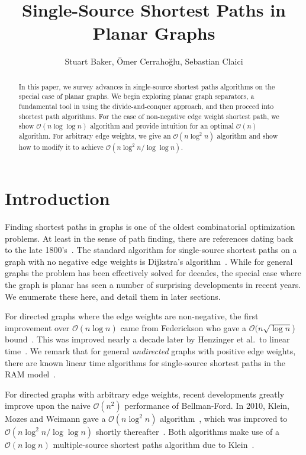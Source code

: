 \documentclass[11pt]{article}
\title{Single-Source Shortest Paths in Planar Graphs}
\author{Stuart Baker, \"{O}mer Cerraho\u{g}lu, Sebastian Claici}
\date{}
\begin{document}
\maketitle

\begin{abstract}
  In this paper, we survey advances in single-source shortest paths algorithms on the special case of planar graphs. We begin exploring planar graph separators, a fundamental tool in using the divide-and-conquer approach, and then proceed into shortest path algorithms. For the case of non-negative edge weight shortest path, we show $\mathcal{O}(n\log \log n)$ algorithm and provide intuition for an optimal $\mathcal{O}(n)$ algorithm. For arbitrary edge weights, we give an $\mathcal{O}(n\log^2 n)$ algorithm and show how to modify it to achieve $\mathcal{O}(n\log^2 n/\log \log n)$.
\end{abstract}

\section{Introduction}
\label{sec:introduction}

Finding shortest paths in graphs is one of the oldest combinatorial optimization problems. At least in the sense of path finding, there are references dating back to the late 1800's~\cite{wiener1873ueber}. The standard algorithm for single-source shortest paths on a graph with no negative edge weights is Dijkstra's algorithm~\cite{dijkstra1959note}. While for general graphs the problem has been effectively solved for decades, the special case where the graph is planar has seen a number of surprising developments in recent years. We enumerate these here, and detail them in later sections.

For directed graphs where the edge weights are non-negative, the first improvement over $\mathcal{O}(n\log n)$ came from Federickson who gave a $\mathcal{O}(n \sqrt{\log n}$) bound~\cite{federickson1987fast}. This was improved nearly a decade later by Henzinger et al.\ to linear time~\cite{henzinger1997faster}. We remark that for general \emph{undirected} graphs with positive edge weights, there are known linear time algorithms for single-source shortest paths in the RAM model~\cite{thorup1999undirected}.

For directed graphs with arbitrary edge weights, recent developments greatly improve upon the naive $\mathcal{O}(n^2)$ performance of Bellman-Ford. In 2010, Klein, Mozes and Weimann gave a $\mathcal{O}(n \log^2 n)$ algorithm~\cite{klein2010shortest}, which was improved to $\mathcal{O}(n \log^2 n / \log \log n)$ shortly thereafter~\cite{mozes2010shortest}. Both algorithms make use of a $\mathcal{O}(n \log n)$ multiple-source shortest paths algorithm due to Klein~\cite{klein2005multiple}.
\end{document}
